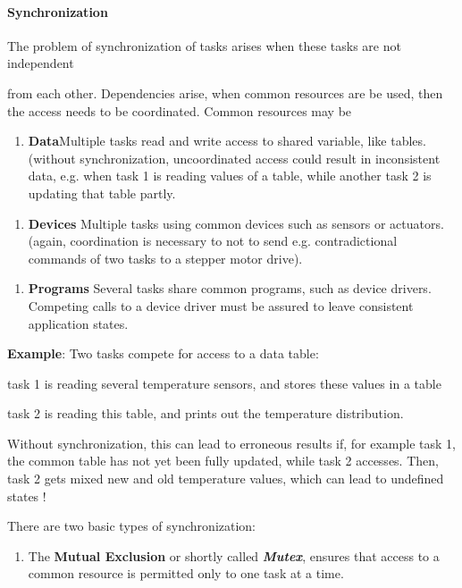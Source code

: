 \paragraph{ Synchronization }

The problem of synchronization of tasks arises when these tasks are not independent

from each other. Dependencies arise, when common resources are be used, then the access needs to be coordinated. Common resources may be

\begin{enumerate}
	\item  \textbf{Data}Multiple tasks read and write access to shared variable, like tables. (without synchronization, uncoordinated access could result in inconsistent data, e.g. when task 1 is reading values of a table, while another task 2 is updating that table partly.
\end{enumerate}

\begin{enumerate}
	\item  \textbf{Devices} Multiple tasks using common devices such as sensors or actuators. (again, coordination is necessary to not to send e.g. contradictional commands of two tasks to a stepper motor drive).
\end{enumerate}

\begin{enumerate}
	\item  \textbf{Programs} Several tasks share common programs, such as device drivers. Competing calls to a device driver must be assured to leave consistent application states.
\end{enumerate}

\textbf{ Example}: Two tasks compete for access to a data table:

task 1 is reading several temperature sensors, and stores these values in a table

task 2 is reading this table, and prints out the temperature distribution.

Without synchronization, this can lead to erroneous results if, for example task 1, the common table has not yet been fully updated, while task 2 accesses. Then, task 2 gets mixed new and old temperature values, which can lead to undefined states !

There are two basic types of synchronization:

\begin{enumerate}
\item  The \textbf{Mutual Exclusion }or shortly called \textbf{\textit{Mutex}}, ensures that access to a common resource is permitted only to one task at a time. 
\end{enumerate}

